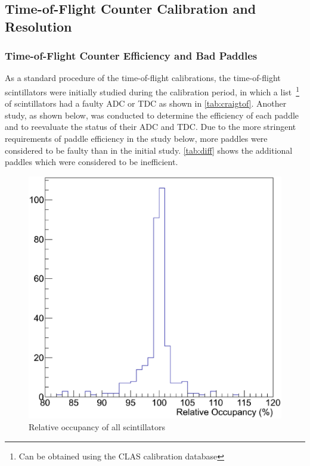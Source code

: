 \subsection{\label{sec:calib.tof}Time-of-Flight Counter Calibration and Resolution}

\subsubsection{\label{sec:calib.tof.eff}Time-of-Flight Counter Efficiency and Bad Paddles}

As a standard procedure of the time-of-flight calibrations, the time-of-flight scintillators were initially studied during the calibration period, in which a list~\footnote{Can be obtained using the CLAS calibration database} of scintillators had a faulty ADC or TDC as shown in \ref{tab:craigtof}. Another study, as shown below, was conducted to determine the efficiency of each paddle and to reevaluate the status of their ADC and TDC. Due to the more stringent requirements of paddle efficiency in the study below, more paddles were considered to be faulty than in the initial study. \ref{tab:diff} shows the additional paddles which were considered to be inefficient.


\begin{figure}
    \includegraphics[trim=0 40 10 40,clip,width=.70\linewidth]{figures/calib/tof/tofko/occp.eps}
    \caption{Relative occupancy of all scintillators}
    \label{plt:occp}
\end{figure}

